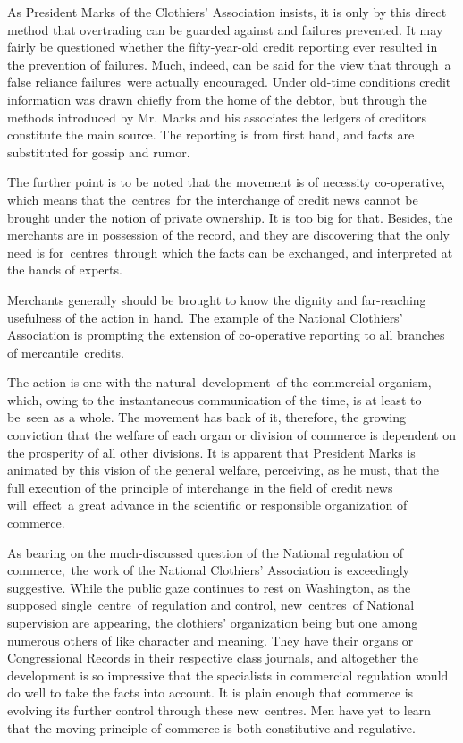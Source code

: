 \documentclass[twoside,symmetric,nobib,justified]{tufte-book}
\begin{document}
As President Marks of the Clothiers' Association insists, it is only by
this direct method that overtrading can be guarded against and failures
prevented. It may fairly be questioned whether the fifty-year-old credit
reporting ever resulted in the prevention of failures. Much, indeed, can
be said for the view that through~a false reliance failures~were
actually encouraged. Under old-time conditions credit information was
drawn chiefly from the home of the debtor, but through the methods
introduced by Mr. Marks and his associates the ledgers of creditors
constitute the main source. The reporting is from first hand, and facts
are substituted for gossip and rumor.~

The further point is to be noted that the movement is of necessity
co-operative, which means that the~centres~for the interchange of credit
news cannot be brought under the notion of private ownership. It is too
big for that. Besides, the merchants are in possession of the record,
and they are discovering that the only need is for~centres~through which
the facts can be exchanged, and interpreted at the hands of experts.~

Merchants generally should be brought to know the dignity and
far-reaching usefulness of the action in hand. The example of the
National Clothiers' Association is prompting the extension of
co-operative reporting to all branches of mercantile~credits.~

The action is one with the natural~development~of the commercial
organism, which, owing to the instantaneous communication of the time,
is at least to be~seen as a whole. The movement has back of it,
therefore, the growing conviction that the welfare of each organ or
division of commerce is dependent on the prosperity of all other
divisions. It is apparent that President Marks is animated by this
vision of the general welfare, perceiving, as he must, that the full
execution of the principle of interchange in the field of credit news
will~effect~a great advance in the scientific or responsible
organization of commerce. ~

As bearing on the much-discussed question of the National regulation of
commerce,~the work of the National Clothiers' Association is exceedingly
suggestive. While the public gaze continues to rest on Washington, as
the supposed single~centre~of regulation and control, new~centres~of
National supervision are appearing, the clothiers' organization being
but one among numerous others of like character and meaning. They have
their organs or Congressional Records in their respective class
journals, and altogether the development is so impressive that the
specialists in commercial regulation would do well to take the facts
into account. It is plain enough that commerce is evolving its further
control through these new~centres. Men have yet to learn that the moving
principle of commerce is both constitutive and regulative.~~
\end{document}
